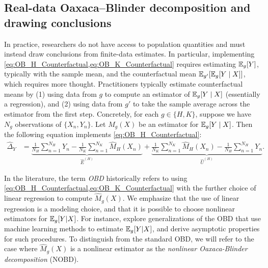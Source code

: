 % 

\subsection{Real-data Oaxaca--Blinder decomposition and drawing conclusions} 
\label{sec:ob_real}
In practice, researchers do not have access to population quantities and must instead draw conclusions from finite-data estimates.
In particular, implementing \cref{eq:OB_H_Counterfactual,eq:OB_K_Counterfactual} requires estimating $\mathbb{E}_g[Y]$, typically with the sample mean, and the counterfactual mean $\mathbb{E}_{g'}[\mathbb{E}_g[Y \mid X]]$, which requires more thought. 
Practitioners typically estimate counterfactual means by (1) using data from $g$ to compute an estimator of $\mathbb{E}_g[Y \mid X]$ (essentially a regression), and (2) using data from $g'$ to take the sample average across the estimator from the first step.
Concretely, for each $g \in {\{H, K\}}$, suppose we have $N_g$ observations of $\{X_n, Y_n\}$. Let $\hat{M}_g(X)$ be an estimator for $\mathbb{E}_g[Y \mid X]$.
Then the following equation implements \cref{eq:OB_H_Counterfactual}:
\begin{align}	
    \hat{\Delta}_Y
    \label{eq:NOBD_H_estimated}
    &=\underbrace{ \frac{1}{N_H} \sum_{n=1}^{N_H} Y_n - \frac{1}{N_K} \sum_{n=1}^{N_K} \hat{M}_H(X_n)}_{\hat{E}^{(H)}} 
     + \underbrace{\frac{1}{N_K} \sum_{n=1}^{N_K} \hat{M}_H(X_n) - \frac{1}{N_H} \sum_{n=1}^{N_H} Y_n}_{\hat{U}^{(H)} }.
\end{align}

In the literature, the term \emph{OBD} historically refers to using \cref{eq:OB_H_Counterfactual,eq:OB_K_Counterfactual} with the further choice of linear regression to compute $\hat{M}_g(X)$.
We emphasize that the use of linear regression is a modeling choice, and that it is possible to choose nonlinear estimators for $\mathbb{E}_g  [ Y | X ]$.
For instance, \citet{quintas2024multiply,flachaire2025decomposing,mao2025double} explore generalizations of the OBD that use machine learning methods to estimate $\mathbb{E}_g  [ Y | X ]$, and derive asymptotic properties for such procedures.
To distinguish from the standard OBD, we will refer to the case where $\hat{M}_g(X)$ is a nonlinear estimator as the \emph{nonlinear Oaxaca-Blinder decomposition} (NOBD).

